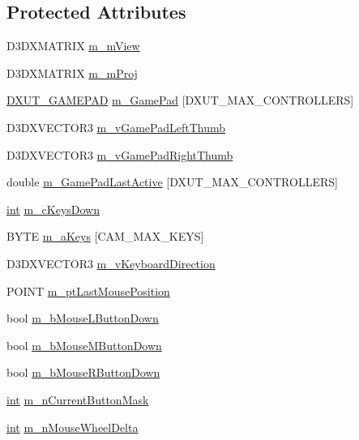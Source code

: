 \subsection*{Protected Attributes}
\begin{DoxyCompactItemize}
\item 
D3DXMATRIX \hyperlink{class_c_base_camera_aa4e76560bdadc557f2e279e8ab00e405}{m\_\-mView}
\item 
D3DXMATRIX \hyperlink{class_c_base_camera_a97b8a160735a4b812e7d3e2637d2025c}{m\_\-mProj}
\item 
\hyperlink{struct_d_x_u_t___g_a_m_e_p_a_d}{DXUT\_\-GAMEPAD} \hyperlink{class_c_base_camera_a944fb74264227b610464a055a6d8c9c4}{m\_\-GamePad} \mbox{[}DXUT\_\-MAX\_\-CONTROLLERS\mbox{]}
\item 
D3DXVECTOR3 \hyperlink{class_c_base_camera_a82a20dcc1d03a97e52f9f336b0f0e33b}{m\_\-vGamePadLeftThumb}
\item 
D3DXVECTOR3 \hyperlink{class_c_base_camera_a1b9e69b2140314515049b30091d9a788}{m\_\-vGamePadRightThumb}
\item 
double \hyperlink{class_c_base_camera_ae2731931f0485bb49b9f3178f9aabe6f}{m\_\-GamePadLastActive} \mbox{[}DXUT\_\-MAX\_\-CONTROLLERS\mbox{]}
\item 
\hyperlink{_d_x_u_tgui_8cpp_a2d77ed03302b6978834ee3b6f57837fb}{int} \hyperlink{class_c_base_camera_ae12aee70bbb423a26ae9ea2161a6eacc}{m\_\-cKeysDown}
\item 
BYTE \hyperlink{class_c_base_camera_aab24266faedbce6a95ca36c23726064c}{m\_\-aKeys} \mbox{[}CAM\_\-MAX\_\-KEYS\mbox{]}
\item 
D3DXVECTOR3 \hyperlink{class_c_base_camera_aed43d3466c7a2d60b7b62845ab602b6f}{m\_\-vKeyboardDirection}
\item 
POINT \hyperlink{class_c_base_camera_a6019b5ba50a3e7c57187d8341292c7d2}{m\_\-ptLastMousePosition}
\item 
bool \hyperlink{class_c_base_camera_a328bd336893fea3959fafeb2938bc426}{m\_\-bMouseLButtonDown}
\item 
bool \hyperlink{class_c_base_camera_a1b56edb22dc3c1383da3524211dcfa6f}{m\_\-bMouseMButtonDown}
\item 
bool \hyperlink{class_c_base_camera_aeed297c389f73cae17eb0b923aa0092e}{m\_\-bMouseRButtonDown}
\item 
\hyperlink{_d_x_u_tgui_8cpp_a2d77ed03302b6978834ee3b6f57837fb}{int} \hyperlink{class_c_base_camera_aa30c8f1421c0e0f00dd1b3b37165bffd}{m\_\-nCurrentButtonMask}
\item 
\hyperlink{_d_x_u_tgui_8cpp_a2d77ed03302b6978834ee3b6f57837fb}{int} \hyperlink{class_c_base_camera_ae6f0a643e814c30ae8f8fe7d8e49c46e}{m\_\-nMouseWheelDelta}

\end{DoxyCompactItemize}
